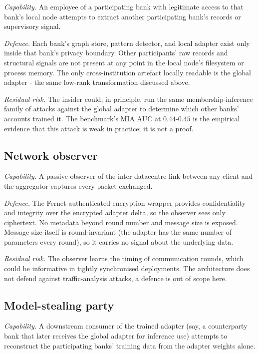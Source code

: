 \documentclass{report}
\begin{document}
\textit{Capability.} An employee of a participating bank with legitimate access to that bank's local node attempts to extract another participating bank's records or supervisory signal.

\textit{Defence.} Each bank's graph store, pattern detector, and local adapter exist only inside that bank's privacy boundary. Other participants' raw records and structural signals are not present at any point in the local node's filesystem or process memory. The only cross-institution artefact locally readable is the global adapter - the same low-rank transformation discussed above.

\textit{Residual risk.} The insider could, in principle, run the same membership-inference family of attacks against the global adapter to determine which other banks' accounts trained it. The benchmark's MIA AUC at $0.44$-$0.45$ is the empirical evidence that this attack is weak in practice; it is not a proof.

\subsection{Network observer}

\textit{Capability.} A passive observer of the inter-datacentre link between any client and the aggregator captures every packet exchanged.

\textit{Defence.} The Fernet authenticated-encryption wrapper provides confidentiality and integrity over the encrypted adapter delta, so the observer sees only ciphertext. No metadata beyond round number and message size is exposed. Message size itself is round-invariant (the adapter has the same number of parameters every round), so it carries no signal about the underlying data.

\textit{Residual risk.} The observer learns the timing of communication rounds, which could be informative in tightly synchronised deployments. The architecture does not defend against traffic-analysis attacks, a defence is out of scope here.

\subsection{Model-stealing party}

\textit{Capability.} A downstream consumer of the trained adapter (say, a counterparty bank that later receives the global adapter for inference use) attempts to reconstruct the participating banks' training data from the adapter weights alone.
\end{document}
